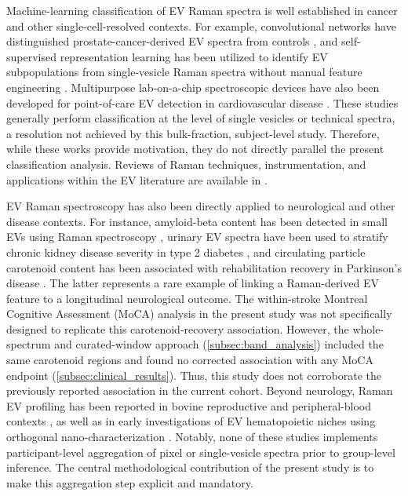 \documentclass[preprint,12pt]{elsarticle}
\begin{document}
Machine-learning classification of EV Raman spectra is well established in cancer and other single-cell-resolved contexts. For example, convolutional networks have distinguished prostate-cancer-derived EV spectra from controls \cite{lee2020}, and self-supervised representation learning has been utilized to identify EV subpopulations from single-vesicle Raman spectra without manual feature engineering \cite{jensen2024}. Multipurpose lab-on-a-chip spectroscopic devices have also been developed for point-of-care EV detection in cardiovascular disease \cite{buchan2025}. These studies generally perform classification at the level of single vesicles or technical spectra, a resolution not achieved by this bulk-fraction, subject-level study. Therefore, while these works provide motivation, they do not directly parallel the present classification analysis. Reviews of Raman techniques, instrumentation, and applications within the EV literature are available in \cite{liu2025}.

EV Raman spectroscopy has also been directly applied to neurological and other disease contexts. For instance, amyloid-beta content has been detected in small EVs using Raman spectroscopy \cite{imanbekova2021}, urinary EV spectra have been used to stratify chronic kidney disease severity in type 2 diabetes \cite{kaminska2022}, and circulating particle carotenoid content has been associated with rehabilitation recovery in Parkinson's disease \cite{gualerzi2025}. The latter represents a rare example of linking a Raman-derived EV feature to a longitudinal neurological outcome. The within-stroke Montreal Cognitive Assessment (MoCA) analysis in the present study was not specifically designed to replicate this carotenoid-recovery association. However, the whole-spectrum and curated-window approach (\cref{subsec:band_analysis}) included the same carotenoid regions and found no corrected association with any MoCA endpoint (\cref{subsec:clinical_results}). Thus, this study does not corroborate the previously reported association in the current cohort. Beyond neurology, Raman EV profiling has been reported in bovine reproductive and peripheral-blood contexts \cite{zhang2020}, as well as in early investigations of EV hematopoietic niches using orthogonal nano-characterization \cite{grenier2025}. Notably, none of these studies implements participant-level aggregation of pixel or single-vesicle spectra prior to group-level inference. The central methodological contribution of the present study is to make this aggregation step explicit and mandatory.
\end{document}
